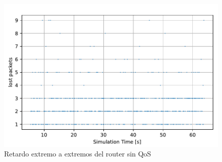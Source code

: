 \begin{figure}[!ht]
  \centering
  \includegraphics{graficas/sinQoS/paquetes_perdidos_sinQoS.pdf}
  \caption{Retardo extremo a extremos del router sin QoS}
  \label{fig:sinqos_lostpkts}
\end{figure}